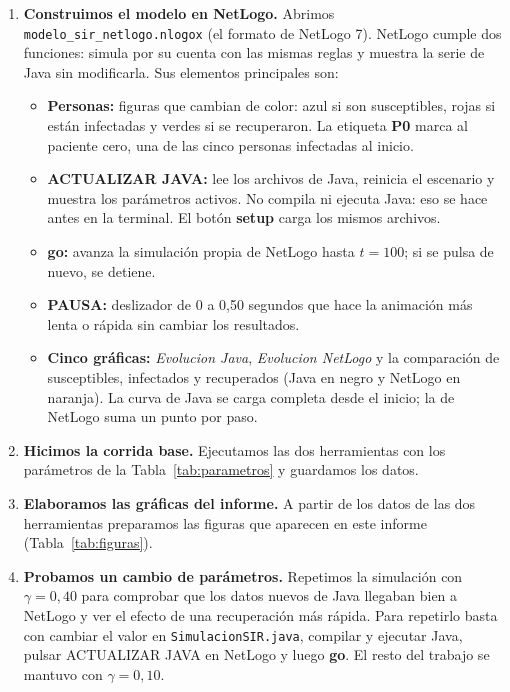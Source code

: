 \documentclass[11pt,a4paper]{article}
\begin{document}
\begin{enumerate}
  \item \textbf{Construimos el modelo en NetLogo.} Abrimos \texttt{modelo\_sir\_netlogo.nlogox} (el formato de NetLogo 7). NetLogo cumple dos funciones: simula por su cuenta con las mismas reglas y muestra la serie de Java sin modificarla. Sus elementos principales son:
  \begin{itemize}
    \item \textbf{Personas:} figuras que cambian de color: azul si son susceptibles, rojas si están infectadas y verdes si se recuperaron. La etiqueta \textbf{P0} marca al paciente cero, una de las cinco personas infectadas al inicio.
    \item \textbf{ACTUALIZAR JAVA:} lee los archivos de Java, reinicia el escenario y muestra los parámetros activos. No compila ni ejecuta Java: eso se hace antes en la terminal. El botón \textbf{setup} carga los mismos archivos.
    \item \textbf{go:} avanza la simulación propia de NetLogo hasta $t=100$; si se pulsa de nuevo, se detiene.
    \item \textbf{PAUSA:} deslizador de 0 a 0,50 segundos que hace la animación más lenta o rápida sin cambiar los resultados.
    \item \textbf{Cinco gráficas:} \emph{Evolucion Java}, \emph{Evolucion NetLogo} y la comparación de susceptibles, infectados y recuperados (Java en negro y NetLogo en naranja). La curva de Java se carga completa desde el inicio; la de NetLogo suma un punto por paso.
  \end{itemize}

  \item \textbf{Hicimos la corrida base.} Ejecutamos las dos herramientas con los parámetros de la Tabla~\ref{tab:parametros} y guardamos los datos.

  \item \textbf{Elaboramos las gráficas del informe.} A partir de los datos de las dos herramientas preparamos las figuras que aparecen en este informe (Tabla~\ref{tab:figuras}).

  \item \textbf{Probamos un cambio de parámetros.} Repetimos la simulación con $\gamma=0{,}40$ para comprobar que los datos nuevos de Java llegaban bien a NetLogo y ver el efecto de una recuperación más rápida. Para repetirlo basta con cambiar el valor en \texttt{SimulacionSIR.java}, compilar y ejecutar Java, pulsar ACTUALIZAR JAVA en NetLogo y luego \textbf{go}. El resto del trabajo se mantuvo con $\gamma=0{,}10$.


\end{enumerate}
\end{document}

